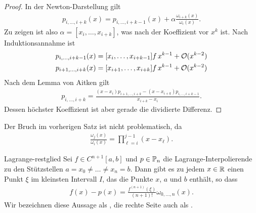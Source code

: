 \begin{proof}
  In der Newton-Darstellung gilt
  \begin{gather}
    p_{i,\dots,i+k}(x) = p_{i,\dots,i+k-1}(x)
    + \alpha \frac{\omega_{i+k}(x)}{\omega_i(x)}.
  \end{gather}
  Zu zeigen ist also $\alpha = [x_i,\dots,x_{i+k}]$, was nach
   der Koeffizient vor $x^k$ ist. Nach
  Induktionsannahme ist
  \begin{gather}
    \begin{split}
      p_{i,\dots,i+k-1}(x) &= [x_i,\dots,x_{i+k-1}]f \,x^{k-1} +\bigo(x^{k-2})\\
      p_{i+1,\dots,i+k}(x) &= [x_{i+1},\dots,x_{i+k}]f \,x^{k-1} +\bigo(x^{k-2})
    \end{split}
  \end{gather}
  Nach dem Lemma von Aitken gilt
  \begin{gather}
    p_{i,\dots,i+k} = \frac{(x-x_i)p_{i+1,\dots,i+k}
      - (x-x_{i+k})p_{i,\dots,i+k-1}}{x_{i+k} - x_i}.
  \end{gather}
  Dessen höchster Koeffizient ist aber gerade die dividierte Differenz.
\end{proof}

\begin{remark}
  Der Bruch im vorherigen Satz ist nicht problematisch, da
  \begin{gather}
    \frac{\omega_j(x)}{\omega_i(x)} = \prod_{\ell=i}^{j-1} (x-x_\ell).
  \end{gather}
\end{remark}

\begin{Satz}{Lagrange-restglied}
  Sei $f \in C^{n+1}[a,b]$ und $p\in \P_n$ die
  Lagrange-Interpolierende zu den Stützstellen
  $a=x_0\neq\dots\neq x_n=b$. Dann gibt es zu jedem $x\in \R$ einen Punkt
  $\xi$ im kleinsten Intervall $I$, das die Punkte $x$, $a$ und $b$
  enthält, so dass
  \begin{gather}
    f(x)- p(x) = \frac{f^{(n+1)}(\xi)}{(n+1)!} \omega_{0,\dots,n}(x).
  \end{gather}
  Wir bezeichnen diese Aussage als , die
  rechte Seite auch als .
\end{Satz}

